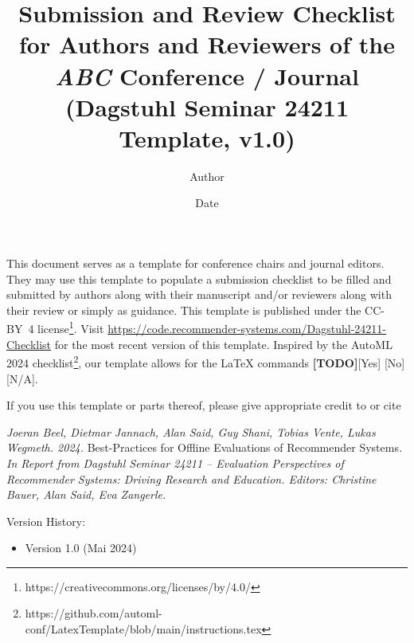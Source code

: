 \documentclass{article}
\title{Submission and Review Checklist for Authors and Reviewers of the \textit{ABC} Conference / Journal \\
(Dagstuhl Seminar 24211 Template, v1.0)}
\author{Author}
\date{Date}
\begin{document}

\newcommand{\answerYes}[1]{{\textcolor{answerYesColor}{[Yes]}\xspace#1}}
\newcommand{\answerNo}[1]{{\textcolor{answerNoColor}{[No]}\xspace#1}}
\newcommand{\answerNA}[1]{{\textcolor{answerNAColor}{[N/A]}\xspace#1}}
\newcommand{\answerTODO}{\textcolor{answerTODOColor}{\textbf{[TODO]}}}


\maketitle

\noindent This document serves as a template for conference chairs and journal editors. They may use this template to populate a submission checklist to be filled and submitted by authors along with their manuscript and/or reviewers along with their review or simply as guidance. This template is published under the CC-BY~4 license\footnote{https://creativecommons.org/licenses/by/4.0/}. Visit 
 \href{https://code.recommender-systems.com/Dagstuhl-24211-Checklist}{https://code.recommender-systems.com/Dagstuhl-24211-Checklist} for the most recent version of this template. Inspired by the AutoML 2024 checklist\footnote{https://github.com/automl-conf/LatexTemplate/blob/main/instructions.tex}, our template allows for the LaTeX commands \answerTODO \answerYes{} \answerNo{} \answerNA{}.

If you use this template or parts thereof, please give appropriate credit to or cite

\begin{displayquote}
\textit{Joeran Beel, Dietmar Jannach, Alan Said, Guy Shani, Tobias Vente, Lukas Wegmeth. 2024. }Best-Practices for Offline Evaluations of Recommender Systems\textit{. In Report from Dagstuhl Seminar 24211 -- Evaluation Perspectives of Recommender Systems: Driving Research and Education. Editors: Christine Bauer, Alan Said, Eva Zangerle.}
\end{displayquote}
Version History:
\begin{itemize}
    \item Version 1.0 (Mai 2024)
\end{itemize}


\end{document}
